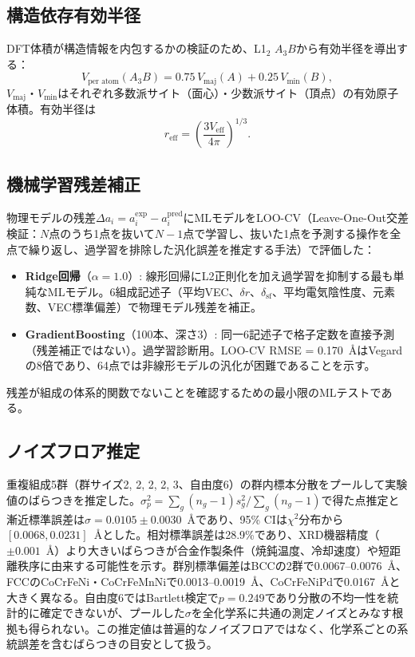 \documentclass[5p,10pt]{elsarticle}
\begin{document}
\subsection{構造依存有効半径}
\label{sec:eff_radii}

DFT体積が構造情報を内包するかの検証のため、L1$_2$ $A_3B$から有効半径を導出する：
\begin{equation}
  V_\text{per atom}(A_3B) = 0.75\,V_\text{maj}(A) +
    0.25\,V_\text{min}(B),
  \label{eq:l12_volume}
\end{equation}
$V_\text{maj}$・$V_\text{min}$はそれぞれ多数派サイト（面心）・少数派サイト（頂点）の有効原子体積。有効半径は
\begin{equation}
  r_\text{eff} = \left(\frac{3V_\text{eff}}{4\pi}\right)^{\!1/3}\!.
  \label{eq:r_eff}
\end{equation}


\subsection{機械学習残差補正}
\label{sec:ml}

物理モデルの残差$\Delta a_i = a_i^\text{exp} - a_i^\text{pred}$にMLモデルをLOO-CV（Leave-One-Out交差検証：$N$点のうち1点を抜いて$N-1$点で学習し、抜いた1点を予測する操作を全点で繰り返し、過学習を排除した汎化誤差を推定する手法）で評価した：
\begin{itemize}
  \item \textbf{Ridge回帰}（$\alpha = 1.0$）: 線形回帰にL2正則化を加え過学習を抑制する最も単純なMLモデル。6組成記述子（平均VEC、$\delta r$、$\delta_\text{sf}$、平均電気陰性度、元素数、VEC標準偏差）で物理モデル残差を補正。
  \item \textbf{GradientBoosting}（100本、深さ3）: 同一6記述子で格子定数を直接予測（残差補正ではない）。過学習診断用。LOO-CV RMSE = 0.170~\AA{}はVegardの8倍であり、64点では非線形モデルの汎化が困難であることを示す。
\end{itemize}
残差が組成の体系的関数でないことを確認するための最小限のMLテストである。


\subsection{ノイズフロア推定}
\label{sec:noise}

重複組成5群（群サイズ2, 2, 2, 2, 3、自由度6）の群内標本分散をプールして実験値のばらつきを推定した。$\sigma_p^2 = \sum_g (n_g-1)s_g^2 / \sum_g(n_g-1)$で得た点推定と漸近標準誤差は$\sigma = 0.0105 \pm 0.0030$~\AA{}であり、95\% CIは$\chi^2$分布から$[0.0068, 0.0231]$~\AA{}とした。相対標準誤差は28.9\%であり、XRD機器精度（$\pm 0.001$~\AA）より大きいばらつきが合金作製条件（焼鈍温度、冷却速度）や短距離秩序に由来する可能性を示す。群別標準偏差はBCCの2群で0.0067--0.0076~\AA{}、FCCのCoCrFeNi・CoCrFeMnNiで0.0013--0.0019~\AA{}、CoCrFeNiPdで0.0167~\AA{}と大きく異なる。自由度6ではBartlett検定で$p = 0.249$であり分散の不均一性を統計的に確定できないが、プールした$\sigma$を全化学系に共通の測定ノイズとみなす根拠も得られない。この推定値は普遍的なノイズフロアではなく、化学系ごとの系統誤差を含むばらつきの目安として扱う。
\end{document}

